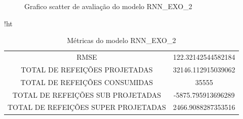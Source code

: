 \documentclass[	12pt, Times, openright, twoside, a4paper, english, brazil]{abntex2}
\begin{document}
                \begin{figure}[H]
                \end{figure}
                \begin{figure}[H]
                  \caption{Grafico scatter de avaliação do modelo RNN\_EXO\_2 \label{fig:case1_rnn_exo_2_val_scatter} }
                \end{figure}
                
                
                 \begin{table}{!ht}
                \centering
                \caption{Métricas do modelo  RNN\_EXO\_2 }
                 \begin{tabular}{|c|c|}
                 \rowcolor{gray!50}
                 \hline
                \multicolumn{2}{c}{METRICAS DO MODELO RNN\_EXO\_2 :}\\ \hline
                RMSE & 122.32142544582184\\
                TOTAL DE REFEIÇÕES PROJETADAS & 32146.112915039062\\
                TOTAL DE REFEIÇÕES CONSUMIDAS & 35555\\
                TOTAL DE REFEIÇÕES SUB PROJETADAS & -5875.795913696289\\
                TOTAL DE REFEIÇÕES SUPER PROJETADAS & 2466.9088287353516\\
                \hline \end{tabular}
                \end{table}
                
\end{document}
